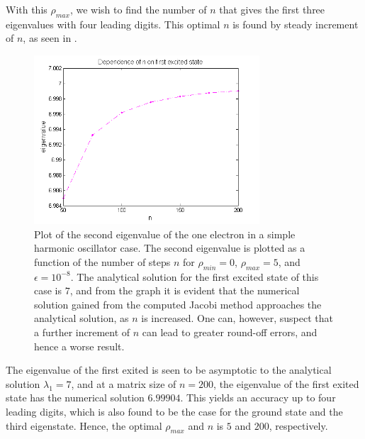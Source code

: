 With this $\rho_{max}$, we wish to find the number of $n$ that gives the first three eigenvalues with four leading digits. 
This optimal $n$ is found by steady increment of $n$, as seen in .
\begin{figure}[H]
	\centering
	\includegraphics[width=0.75\textwidth]{Figures/MatrixSizeOnEigenvalue_2state.png}
	\caption{Plot of the second eigenvalue of the one electron in a simple harmonic oscillator case. The second eigenvalue is plotted as a function of the number of steps $n$ for $\rho_{min} = 0$, $\rho_{max} = 5$, and $\epsilon = 10^{-8}$. The analytical solution for the first excited state of this case is $7$, and from the graph it is evident that the numerical solution gained from the computed Jacobi method approaches the analytical solution, as $n$ is increased. One can, however, suspect that a further increment of $n$ can lead to greater round-off errors, and hence a worse result.}
	\label{fig:DependenceOnEigenvalue2}
\end{figure}
The eigenvalue of the first exited is seen to be asymptotic to the analytical solution $\lambda_1 = 7$, and at a matrix size of $n=200$,  the eigenvalue of the first exited state has the numerical solution $6.99904$. 
This yields an accuracy up to four leading digits, which is also found to be the case for the ground state and the third eigenstate.
Hence, the optimal $\rho_{max}$ and $n$ is $5$ and $200$, respectively. 
